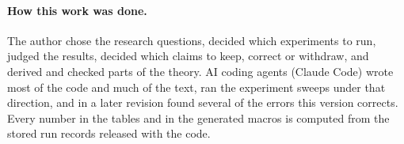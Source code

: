 \documentclass[10pt,twocolumn]{article}
\theoremstyle{definition}
\begin{document}
\renewcommand{\thefootnote}{\fnsymbol{footnote}}
\renewcommand{\thefootnote}{\arabic{footnote}}


\clearpage













\paragraph{How this work was done.} The author chose the research questions, decided which
experiments to run, judged the results, decided which claims to keep, correct or withdraw, and
derived and checked parts of the theory. AI coding agents (Claude Code) wrote most of the code and
much of the text, ran the experiment sweeps under that direction, and in a later revision found
several of the errors this version corrects. Every number in the tables and in the generated macros
is computed from the stored run records released with the code.



\appendix

\end{document}

